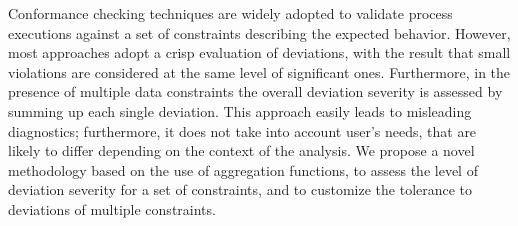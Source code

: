 
 Conformance checking techniques are widely adopted to validate process executions against a set of constraints describing the expected behavior. However, most approaches adopt a crisp evaluation of
 deviations, with the result that small violations are considered at the same level of significant ones. %
 Furthermore, in the presence of multiple data constraints the overall deviation severity is assessed by summing up each single deviation. This approach easily leads to misleading diagnostics; furthermore, it does not take into account user's needs, that are likely to differ depending on the context of the analysis.
We propose a novel methodology based on the use of aggregation functions, to assess the level of deviation severity for a set of constraints, and to customize the tolerance to deviations of multiple constraints.

